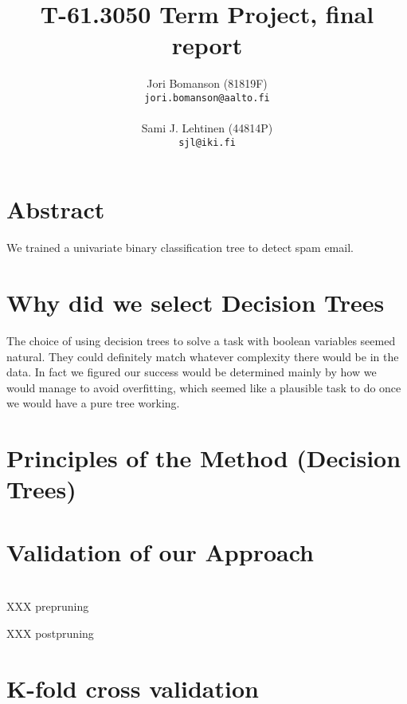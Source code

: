 \documentclass[a4paper,10pt]{article}
\title{T-61.3050 Term Project, final report} %
\author{Jori Bomanson (81819F) \\
  {\tt jori.bomanson@aalto.fi} \\
  \\
  Sami J. Lehtinen (44814P)\\ 
  {\tt sjl@iki.fi} \\
}
\begin{document}

\maketitle

\section*{Abstract}
We trained a univariate binary classification tree to detect spam email.


\section*{}

\section*{Why did we select Decision Trees}

The choice of using decision trees to solve a task with boolean variables
seemed natural. They could definitely match whatever complexity there would
be in the data. %
In fact we figured our success would be determined mainly by how we would
manage to avoid overfitting, which seemed like a plausible task to do once
we would have a pure tree working.


\section*{Principles of the Method (Decision Trees)}


\section*{Validation of our Approach}

\section*{}

XXX prepruning

XXX postpruning

\section{K-fold cross validation}
\end{document}
